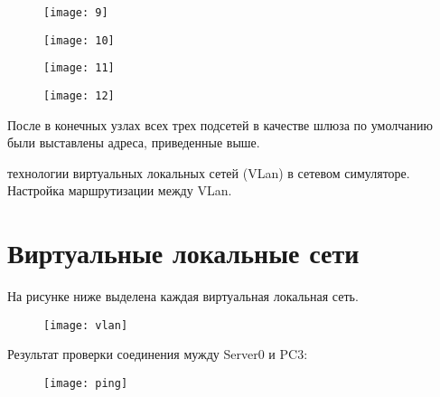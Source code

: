 \documentclass[a4paper, 14pt]{article}
\begin{document}
\begin{figure}[H]
    \texttt{[image: 9]}
    \label{fig:6}
\end{figure}
\begin{figure}[H]
    \texttt{[image: 10]}
    \label{fig:6}
\end{figure}
\begin{figure}[H]
    \texttt{[image: 11]}
    \label{fig:6}
\end{figure}
\begin{figure}[H]
    \texttt{[image: 12]}
    \label{fig:6}
\end{figure}

После в конечных узлах всех трех подсетей в качестве шлюза по умолчанию были выставлены адреса, приведенные выше.

 технологии виртуальных локальных сетей (VLan) в сетевом симуляторе. Настройка маршрутизации между VLan.
\section*{Виртуальные локальные сети}

На рисунке ниже выделена каждая виртуальная локальная сеть.

\begin{figure}[H]
    \texttt{[image: vlan]}
    \label{fig:7}
\end{figure}

Результат проверки соединения мужду Server0 и PC3:

\begin{figure}[H]
    \texttt{[image: ping]}
    \label{fig:8}
\end{figure}
\end{document}
